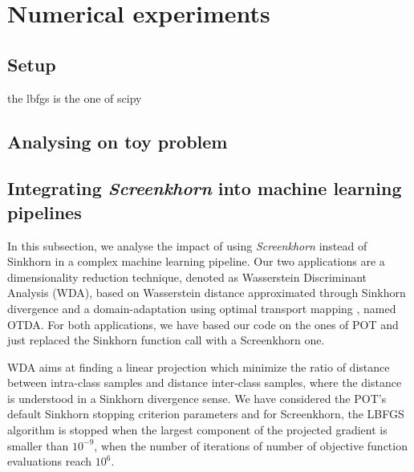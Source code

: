 
\section{Numerical experiments} %
\label{sec:numerical_experiments}

\subsection{Setup}
the lbfgs is the one of scipy


\subsection{Analysing on toy problem}































\subsection{Integrating \emph{Screenkhorn} into machine learning pipelines}

In this subsection, we analyse the impact of using \emph{Screenkhorn}
instead of Sinkhorn in a complex machine learning pipeline. Our two applications
are a dimensionality reduction technique, denoted as Wasserstein Discriminant Analysis (WDA), based on Wasserstein distance approximated
through Sinkhorn divergence \cite{flamary2018WDA} and a domain-adaptation using optimal transport mapping \cite{courty2017optimal}, named OTDA. For both applications, we have based our code
on the ones of POT \cite{flamary2017pot} and just replaced the Sinkhorn function call with a Screenkhorn one.

WDA aims at finding a linear projection which minimize the ratio of distance between intra-class samples and distance inter-class samples, where the distance is understood
in a Sinkhorn divergence sense. We have considered the POT's default Sinkhorn stopping criterion parameters and for Screenkhorn, the LBFGS algorithm is stopped when the 
largest component of the projected gradient is smaller than $10^{-9}$, when the
number of iterations of number of objective function evaluations reach $10^{6}$.

